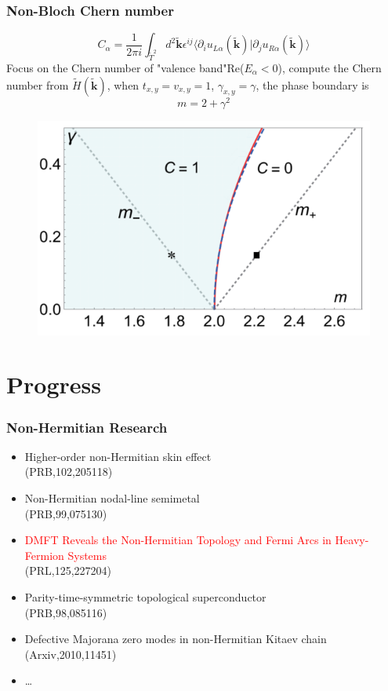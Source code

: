 \documentclass{beamer}
\begin{document}
\begin{frame}
\frametitle{Non-Bloch Chern number}
\begin{equation}
C_\alpha=\frac{1}{2\pi i}\int_{\tilde{T}^2}d^2\mathbf{\tilde{k}}\epsilon^{ij}\langle \partial_iu_{L\alpha}(\tilde{\mathbf{k}})|\partial_ju_{R\alpha}(\tilde{\mathbf{k}})\rangle
\end{equation}
Focus on the Chern number of "valence band"Re($E_ \alpha<0$), compute the Chern number from $\tilde{H}(\tilde{\mathbf{k}})$, when $t_{x,y}=v_{x,y}=1$, $\gamma_{x,y}=\gamma$, the phase boundary is 
\begin{equation}
m=2+\gamma^2
\end{equation}
\begin{figure}
\includegraphics[scale=0.45]{figure/2d-1.png}
\end{figure}
\end{frame}
\section{Progress}
\begin{frame}
\frametitle{Non-Hermitian Research}
\begin{itemize}
	\item Higher-order non-Hermitian skin effect\\
	(PRB,102,205118)
	\item Non-Hermitian nodal-line semimetal\\
	(PRB,99,075130)
	\item \textcolor{red}{DMFT Reveals the Non-Hermitian Topology and Fermi Arcs in Heavy-Fermion Systems}\\
	(PRL,125,227204)
	\item Parity-time-symmetric topological superconductor\\
	(PRB,98,085116)
	\item Defective Majorana zero modes in non-Hermitian Kitaev chain\\
	(Arxiv,2010,11451)
	\item \dots
\end{itemize}
\end{frame}
\end{document}
